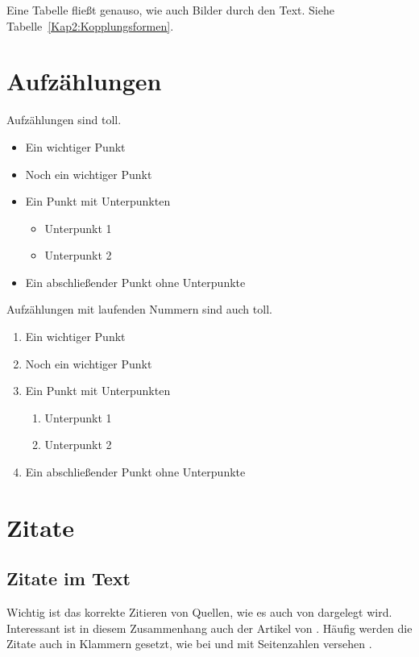 Eine Tabelle fließt genauso, wie auch Bilder durch den Text. Siehe Tabelle~\ref{Kap2:Kopplungsformen}.


\section{Aufzählungen}

Aufzählungen sind toll.

\begin{itemize}
  \item Ein wichtiger Punkt
  \item Noch ein wichtiger Punkt
  \item Ein Punkt mit Unterpunkten
    \begin{itemize}
      \item Unterpunkt 1
      \item Unterpunkt 2      
    \end{itemize}
  \item Ein abschließender Punkt ohne Unterpunkte
\end{itemize}


Aufzählungen mit laufenden Nummern sind auch toll.

\begin{enumerate}
  \item Ein wichtiger Punkt
  \item Noch ein wichtiger Punkt
  \item Ein Punkt mit Unterpunkten
    \begin{enumerate}
      \item Unterpunkt 1
      \item Unterpunkt 2      
    \end{enumerate}
  \item Ein abschließender Punkt ohne Unterpunkte
\end{enumerate}


\section{Zitate}

\subsection{Zitate im Text}

Wichtig ist das korrekte Zitieren von Quellen, wie es auch von \cite{Kornmeier2011} dargelegt wird. Interessant ist in diesem Zusammenhang auch der Artikel von \cite{Kramer2009}. Häufig werden die Zitate auch in Klammern gesetzt, wie bei \parencite{Kornmeier2011} und mit Seitenzahlen versehen \parencite[S. 22--24]{Kornmeier2011}.


